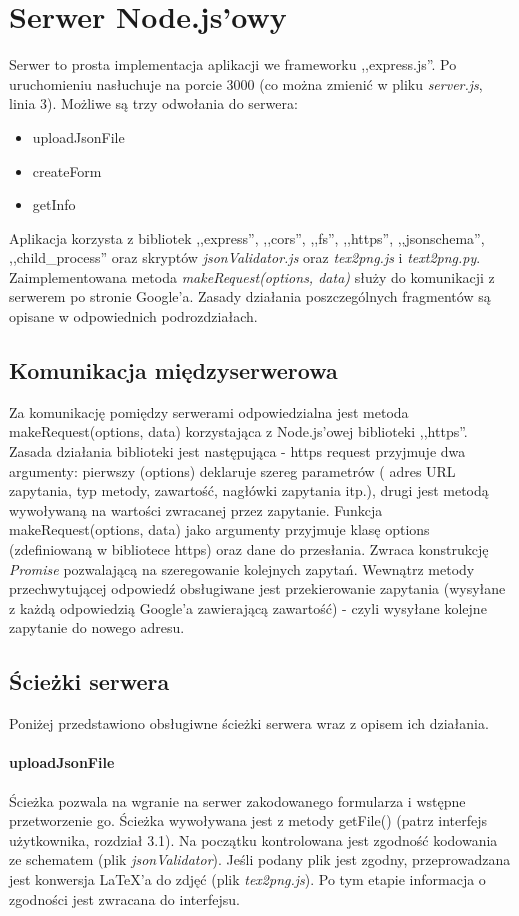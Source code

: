 

\section{Serwer Node.js'owy}
Serwer to prosta implementacja aplikacji we frameworku ,,express.js''. Po uruchomieniu nasłuchuje na porcie 3000 (co można zmienić w pliku \textit{server.js}, linia 3). Możliwe są trzy odwołania do serwera:
\begin{itemize}
\item uploadJsonFile
\item createForm
\item getInfo
\end{itemize}
Aplikacja korzysta z bibliotek ,,express'', ,,cors'', ,,fs'', ,,https'', ,,jsonschema'', ,,child\_process''  oraz skryptów \textit{jsonValidator.js} oraz \textit{tex2png.js} i \textit{text2png.py}.
Zaimplementowana metoda \textit{makeRequest(options, data)} służy do komunikacji z serwerem po stronie Google'a.
\ind Zasady działania poszczególnych fragmentów są opisane w odpowiednich podrozdziałach.
\subsection{Komunikacja międzyserwerowa}
Za komunikację pomiędzy serwerami odpowiedzialna jest metoda makeRequest(options, data) korzystająca z Node.js'owej biblioteki ,,https''. Zasada działania biblioteki jest następująca - https request przyjmuje dwa argumenty: pierwszy (options) deklaruje szereg parametrów ( adres URL zapytania, typ metody, zawartość, nagłówki zapytania itp.), drugi jest metodą wywoływaną na wartości zwracanej przez zapytanie. 
\ind Funkcja makeRequest(options, data) jako argumenty przyjmuje klasę options (zdefiniowaną w bibliotece https) oraz dane do przesłania. Zwraca konstrukcję \textit{Promise} pozwalającą na szeregowanie kolejnych zapytań. Wewnątrz metody przechwytującej odpowiedź obsługiwane jest przekierowanie zapytania (wysyłane z każdą odpowiedzią Google'a zawierającą zawartość) - czyli wysyłane kolejne zapytanie do nowego adresu.
\subsection{Ścieżki serwera}
Poniżej przedstawiono obsługiwne ścieżki serwera wraz z opisem ich działania.
\paragraph{uploadJsonFile} Ścieżka pozwala na wgranie na serwer zakodowanego formularza i wstępne przetworzenie go. Ścieżka wywoływana jest z metody getFile() (patrz interfejs użytkownika, rozdział 3.1). Na początku kontrolowana jest zgodność kodowania ze schematem (plik \textit{jsonValidator}). Jeśli podany plik jest zgodny, przeprowadzana jest konwersja \LaTeX{}'a do zdjęć (plik \textit{tex2png.js}). Po tym etapie informacja o zgodności jest zwracana do interfejsu.
